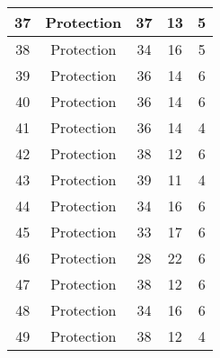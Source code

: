 \documentclass[results.tex]{subfiles}
\begin{document}
\begin{center}
\begin{tabular}{| c || c | c | c | c |}
            \hline
            37                      & Protection                   & 37                     & 13                      & 5                    \\
            \hline
            38                      & Protection                   & 34                     & 16                      & 5                    \\
            \hline
            39                      & Protection                   & 36                     & 14                      & 6                    \\
            \hline
            40                      & Protection                   & 36                     & 14                      & 6                    \\
            \hline
            41                      & Protection                   & 36                     & 14                      & 4                    \\
            \hline
            42                      & Protection                   & 38                     & 12                      & 6                    \\
            \hline
            43                      & Protection                   & 39                     & 11                      & 4                    \\
            \hline
            44                      & Protection                   & 34                     & 16                      & 6                    \\
            \hline
            45                      & Protection                   & 33                     & 17                      & 6                    \\
            \hline
            46                      & Protection                   & 28                     & 22                      & 6                    \\
            \hline
            47                      & Protection                   & 38                     & 12                      & 6                    \\
            \hline
            48                      & Protection                   & 34                     & 16                      & 6                    \\
            \hline
            49                      & Protection                   & 38                     & 12                      & 4                    \\
            \hline
        \end{tabular}
    \end{center}
\end{document}
